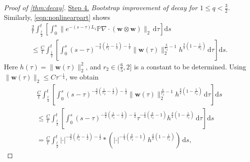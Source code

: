 \documentclass[10pt]{amsart}
\theoremstyle{plain}
\theoremstyle{definition}
\theoremstyle{remark}
\numberwithin{equation}{section}
\newcommand{\bw}{{\boldsymbol{w}}}
\begin{document}
\begin{proof}[Proof of \cref{thm:decay}]
\uline{Step 4.} \emph{Bootstrap improvement of decay for $1 \le q < \frac{3}{2}$.}
Similarly, \cref{eqn:nonlinearpart} shows
\begin{align*}
&\frac{2}{t} \int_{\frac{t}{2}}^{t} \left[ \int_0^s  \|e^{-(s-\tau)L_1} \mathbb{P}\nabla\cdot (\bw \otimes \bw)\|_2 \, \mathrm{d} \tau \right] \mathrm{d}s\\
& \le  \frac{C}{t} \int_{\frac{t}{2}}^{t} 
\left[ \int_0^s (s-\tau)^{-\frac{3}{2}(\frac{1}{r_2}-\frac{1}{2})-\frac{1}{2}} \|\bw(\tau)\|_2^{\frac{3}{r_2}-1}  h^{\frac32(1-\frac{1}{r_2})} \, \mathrm{d} \tau \right] \mathrm{d}s.
\end{align*}
Here $h(\tau)=\|\bw(\tau)\|_2^2$, and $r_2\in (\frac{6}{5},2]$ is a constant to be determined. Using $\|\bw(\tau)\|_2 \le C\tau^{-\frac{1}{4}}$, we obtain
\begin{align*}
&\frac{C}{t} \int_{\frac{t}{2}}^{t} 
\left[ \int_0^s (s-\tau)^{-\frac{3}{2}(\frac{1}{r_2}-\frac{1}{2})-\frac{1}{2}} \|\bw(\tau)\|_2^{\frac{3}{r_2}-1}  h^{\frac32(1-\frac{1}{r_2})} \, \mathrm{d} \tau \right] \mathrm{d}s\\
& \le   \frac{C}{t} \int_{\frac{t}{2}}^{t} 
\left[ \int_0^s (s-\tau)^{-\frac{3}{2}(\frac{1}{r_2}-\frac{1}{2})-\frac{1}{2}}  \tau^{-\frac{1}{4}(\frac{3}{r_2}-1)}  h^{\frac{3}{2}(1-\frac{1}{r_2})} \, \mathrm{d} \tau \right] \mathrm{d}s\\
&=\frac{C}{t} \int_{\frac{t}{2}}^{t} 
|\cdot|^{-\frac{3}{2}(\frac{1}{r_2}-\frac{1}{2})-\frac{1}{2}} \ast ( |\cdot|^{-\frac{1}{4}(\frac{3}{r_2}-1)} \, h^{\frac{3}{2}(1-\frac{1}{r_2})})\, \mathrm{d}s,
\end{align*}

\end{proof}
\end{document}
